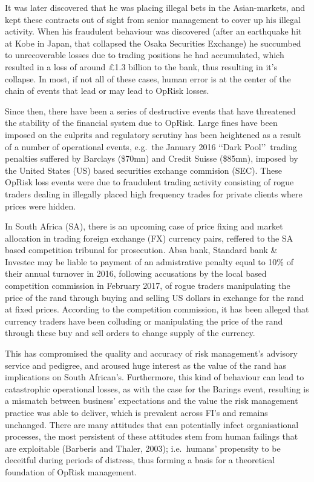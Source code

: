 \documentclass[]{DissertateUSU}
\begin{document}
It was later discovered that he was placing illegal bets in the
Asian-markets, and kept these contracts out of sight from senior
management to cover up his illegal activity. When his fraudulent
behaviour was discovered (after an earthquake hit at Kobe in Japan, that
collapsed the Osaka Securities Exchange) he succumbed to unrecoverable
losses due to trading positions he had accumulated, which resulted in a
loss of around \pounds 1.3 billion to the bank, thus resulting in it's
collapse. In most, if not all of these cases, human error is at the
center of the chain of events that lead or may lead to OpRisk
losses.\medskip\medskip

Since then, there have been a series of destructive events that have
threatened the stability of the financial system due to OpRisk. Large
fines have been imposed on the culprits and regulatory scrutiny has been
heightened as a result of a number of operational events, e.g.~the
January 2016 \lq\lq Dark Pool\rq\rq~trading penalties suffered by
Barclays (\$70mn) and Credit Suisse (\$85mn), imposed by the United
States (US) based securities exchange commision (SEC). These OpRisk loss
events were due to fraudulent trading activity consisting of rogue
traders dealing in illegally placed high frequency trades for private
clients where prices were hidden.\medskip 

In South Africa (SA), there is an upcoming case of price fixing and
market allocation in trading foreign exchange (FX) currency pairs,
reffered to the SA based competition tribunal for prosecution. Absa
bank, Standard bank \& Investec may be liable to payment of an
admistrative penalty equal to 10\% of their annual turnover in 2016,
following accusations by the local based competition commission in
February 2017, of rogue traders manipulating the price of the rand
through buying and selling US dollars in exchange for the rand at fixed
prices. According to the competition commission, it has been alleged
that currency traders have been colluding or manipulating the price of
the rand through these buy and sell orders to change supply of the
currency.\medskip

This has compromised the quality and accuracy of risk management's
advisory service and pedigree, and aroused huge interest as the value of
the rand has implications on South African's. Furthermore, this kind of
behaviour can lead to catastrophic operational losses, as with the case
for the Barings event, resulting is a mismatch between business'
expectations and the value the risk management practice was able to
deliver, which is prevalent across FI's and remains unchanged. There are
many attitudes that can potentially infect organisational processes, the
most persistent of these attitudes stem from human failings that are
exploitable (Barberis and Thaler, 2003); i.e.~humans' propensity to be
deceitful during periods of distress, thus forming a basis for a
theoretical foundation of OpRisk management.
\end{document}
